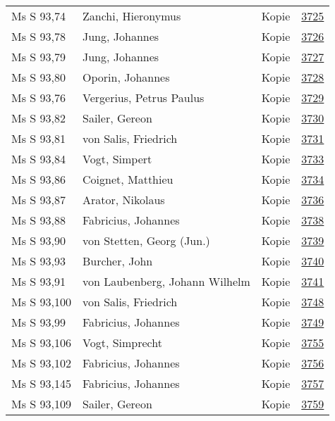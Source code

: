\documentclass[10pt,a4paper,landscape]{report}
\begin{document}
\begin{longtable}{p{16cm}p{4cm}lr}
Ms S 93,74	&	Zanchi, Hieronymus	&	Kopie	&	\href{http://130.60.24.72/assignment/3725}{3725}\\
Ms S 93,78	&	Jung, Johannes	&	Kopie	&	\href{http://130.60.24.72/assignment/3726}{3726}\\
Ms S 93,79	&	Jung, Johannes	&	Kopie	&	\href{http://130.60.24.72/assignment/3727}{3727}\\
Ms S 93,80	&	Oporin, Johannes	&	Kopie	&	\href{http://130.60.24.72/assignment/3728}{3728}\\
Ms S 93,76	&	Vergerius, Petrus Paulus	&	Kopie	&	\href{http://130.60.24.72/assignment/3729}{3729}\\
Ms S 93,82	&	Sailer, Gereon	&	Kopie	&	\href{http://130.60.24.72/assignment/3730}{3730}\\
Ms S 93,81	&	von Salis, Friedrich	&	Kopie	&	\href{http://130.60.24.72/assignment/3731}{3731}\\
Ms S 93,84	&	Vogt, Simpert	&	Kopie	&	\href{http://130.60.24.72/assignment/3733}{3733}\\
Ms S 93,86	&	Coignet, Matthieu	&	Kopie	&	\href{http://130.60.24.72/assignment/3734}{3734}\\
Ms S 93,87	&	Arator, Nikolaus	&	Kopie	&	\href{http://130.60.24.72/assignment/3736}{3736}\\
Ms S 93,88	&	Fabricius, Johannes	&	Kopie	&	\href{http://130.60.24.72/assignment/3738}{3738}\\
Ms S 93,90	&	von Stetten, Georg (Jun.)	&	Kopie	&	\href{http://130.60.24.72/assignment/3739}{3739}\\
Ms S 93,93	&	Burcher, John	&	Kopie	&	\href{http://130.60.24.72/assignment/3740}{3740}\\
Ms S 93,91	&	von Laubenberg, Johann Wilhelm	&	Kopie	&	\href{http://130.60.24.72/assignment/3741}{3741}\\
Ms S 93,100	&	von Salis, Friedrich	&	Kopie	&	\href{http://130.60.24.72/assignment/3748}{3748}\\
Ms S 93,99	&	Fabricius, Johannes	&	Kopie	&	\href{http://130.60.24.72/assignment/3749}{3749}\\
Ms S 93,106	&	Vogt, Simprecht	&	Kopie	&	\href{http://130.60.24.72/assignment/3755}{3755}\\
Ms S 93,102	&	Fabricius, Johannes	&	Kopie	&	\href{http://130.60.24.72/assignment/3756}{3756}\\
Ms S 93,145	&	Fabricius, Johannes	&	Kopie	&	\href{http://130.60.24.72/assignment/3757}{3757}\\
Ms S 93,109	&	Sailer, Gereon	&	Kopie	&	\href{http://130.60.24.72/assignment/3759}{3759}\\

\end{longtable}
\end{document}
